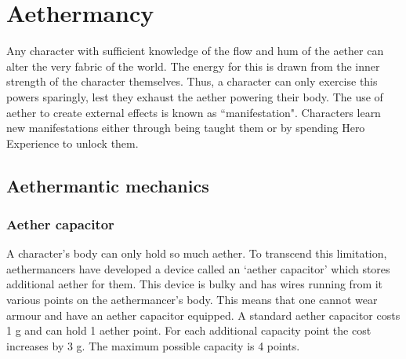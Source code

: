 \documentclass[a4paper,11pt,oneside]{book}
\newcommand{\textlf}[1]{\textbf{\titlecap{#1}}}
\begin{document}
%
%
%





\chapter{Aethermancy}
\label{chap:magic}

Any character with sufficient knowledge of the flow and hum of the aether can alter the very fabric of the world.  The energy for this is drawn from the inner strength of the character themselves. Thus, a character can only exercise this powers sparingly, lest they exhaust the aether powering their body. The use of aether to create external effects is known as ``manifestation". Characters learn new manifestations either through being taught them or by spending Hero Experience to unlock them.

\section{Aethermantic mechanics}

\subsection{Aether capacitor}
\label{sec:capacitor}
A character's body can only hold so much aether. To transcend this limitation, aethermancers have developed a device called an `aether capacitor' which stores additional aether for them. This device is bulky and has wires running from it various points on the aethermancer's body. This means that one cannot wear armour and have an aether capacitor equipped. A standard aether capacitor costs 1 g and can hold 1 aether point. For each additional capacity point the cost increases by 3 g. The maximum possible capacity is 4 points.  
\end{document}
